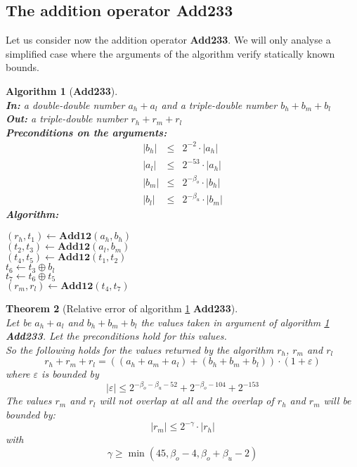 \documentclass[a4paper,10pt,twoside]{article}
\newtheorem{theorem}{Theorem}[section]
\newtheorem{algorithm}[theorem]{Algorithm}
\newcommand{\hi}{\ensuremath{\mathit{h}}}
\newcommand{\mi}{\ensuremath{\mathit{m}}}
\newcommand{\lo}{\ensuremath{\mathit{l}}}
\newcommand{\AddDTT}{{\bf Add233}}
\newcommand{\mAdd}{\ensuremath{\mathbf{Add12}}}
\renewcommand{\epsilon}{\varepsilon}
\begin{document}
\subsection{The addition operator \AddDTT}
Let us consider now the addition operator \AddDTT. We will only analyse a simplified case where the arguments of the
algorithm verify statically known bounds.
\begin{algorithm}[\AddDTT] \label{addDTTref} ~ \\
{\bf In:} a double-double number $a_\hi + a_\lo$ and a triple-double number $b_\hi + b_\mi + b_\lo$ \\
{\bf Out:} a triple-double number $r_\hi + r_\mi + r_\lo$ \\
{\bf Preconditions on the arguments:}
\begin{eqnarray*}
\left \vert b_\hi \right \vert & \leq & 2^{-2} \cdot \left \vert a_\hi \right \vert \\
\left \vert a_\lo \right \vert & \leq & 2^{-53} \cdot \left \vert a_\hi \right \vert \\
\left \vert b_\mi \right \vert & \leq & 2^{-\beta_o} \cdot \left \vert b_\hi \right \vert \\
\left \vert b_\lo \right \vert & \leq & 2^{-\beta_u} \cdot \left \vert b_\mi \right \vert
\end{eqnarray*}
{\bf Algorithm:} \\
\begin{center}
\begin{minipage}[b]{50mm}
$\left( r_\hi, t_1 \right) \gets \mAdd\left( a_\hi, b_\hi \right)$ \\
$\left( t_2, t_3 \right) \gets \mAdd\left( a_\lo, b_\mi \right)$ \\
$\left( t_4, t_5 \right) \gets \mAdd\left( t_1, t_2 \right)$ \\
$t_6 \gets t_3 \oplus b_\lo$ \\
$t_7 \gets t_6 \oplus t_5$ \\
$\left( r_\mi, r_\lo \right) \gets \mAdd\left( t_4, t_7 \right)$ \\
\end{minipage}
\end{center}
\end{algorithm}
\begin{theorem}[Relative error of algorithm \ref{addDTTref} \AddDTT] ~ \\
Let be $a_\hi + a_\lo$ and $b_\hi + b_\mi + b_\lo$ the values taken in argument of algorithm \ref{addDTTref} \AddDTT.
Let the preconditions hold for this values.\\
So the following holds for the values returned by the algorithm $r_\hi$, $r_\mi$ and $r_\lo$
$$r_\hi + r_\mi + r_\lo = \left(\left(a_\hi + a_\mi + a_\lo \right) + \left( b_\hi + b_\mi + b_\lo \right)\right) \cdot \left(1 + \epsilon\right)$$
where $\epsilon$ is bounded by
$$\left \vert \epsilon \right \vert \leq 2^{-\beta_o - \beta_u - 52} + 2^{-\beta_o - 104} + 2^{-153}$$
The values $r_\mi$ and $r_\lo$ will not overlap at all and the overlap of $r_\hi$ and $r_\mi$ will be bounded by:
$$\left \vert r_\mi \right \vert \leq 2^{-\gamma} \cdot \left \vert r_\hi \right \vert$$
with
$$\gamma \geq \min\left( 45, \beta_o - 4, \beta_o + \beta_u - 2 \right)$$
\end{theorem}
\end{document}
